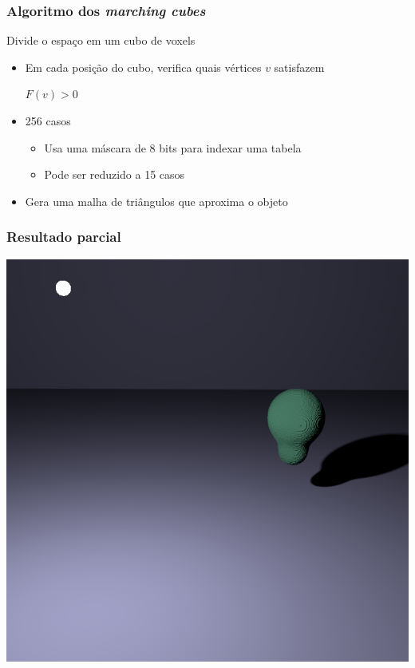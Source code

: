 \documentclass[brazil]{beamer}
\begin{document}
      \begin{frame}
        \frametitle{Algoritmo dos \textit{marching cubes}}
        Divide o espaço em um cubo de voxels
        \begin{itemize}
          \vspace{1em}
          \item
            Em cada posição do cubo, verifica quais vértices $v$ satisfazem
            \vspace{1em}
            \begin{center}
              $F(v) > 0$
            \end{center}
          \pause
          \vspace{1em}
          \item
            256 casos
            \begin{itemize}
              \item Usa uma máscara de 8 bits para indexar uma tabela
              \item Pode ser reduzido a 15 casos
            \end{itemize}
          \vspace{1em}
          \pause
          \item Gera uma malha de triângulos que aproxima o objeto
        \end{itemize}
      \end{frame}
    
      \begin{frame}
        \frametitle{Resultado parcial}
        \begin{center}
          \includegraphics[width=.6\textwidth]{imgs/metaball-preview.png}
        \end{center}
      \end{frame}
  
\end{document}

